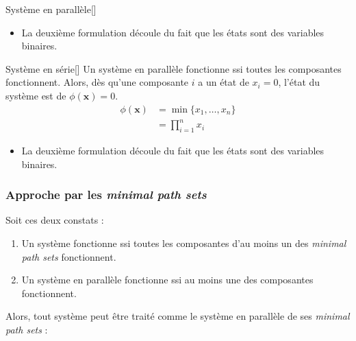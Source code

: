 \documentclass[10pt, french]{article}
\begin{document}
\begin{multicols*}{2}
\begin{definitionGENERAL}{Système en parallèle}[]
\begin{itemize}
	\item	La deuxième formulation découle du fait que les états sont des variables binaires.
\end{itemize}
\end{definitionGENERAL}

\begin{definitionGENERAL}{Système en série}[]
Un système en parallèle fonctionne ssi toutes les composantes fonctionnent. Alors, dès qu'une composante $i$ a un état de $x_{i} = 0$, l'état du système est de $\phi(\bm{x}) = 0$.	\\
\begin{align*}
	\phi(\bm{x})
	&=	\min\{x_{1}, \dots, x_{n}\}	\\
	&=	\prod_{i = 1}^{n} x_{i}
\end{align*}

\begin{itemize}
	\item	La deuxième formulation découle du fait que les états sont des variables binaires.
\end{itemize}
\end{definitionGENERAL}


\subsubsection{Approche par les \og \textit{minimal path sets} \fg{}}
Soit ces deux constats : 
\begin{enumerate}[label	=	\circled{\arabic*}{trueblue}]
	\item	Un système fonctionne ssi toutes les composantes d'au moins un des \og \textit{minimal path sets} \fg{} fonctionnent.
	\item	Un système en parallèle fonctionne ssi au moins une des composantes fonctionnent.
\end{enumerate}

Alors, tout système peut être traité comme le système en parallèle de ses \og \textit{minimal path sets} \fg{} :
\begin{center}
\begin{tikzpicture}[x=0.75pt,y=0.75pt,yscale=-1,xscale=1]


\end{tikzpicture}
\end{center}
\end{multicols*}
\end{document}
